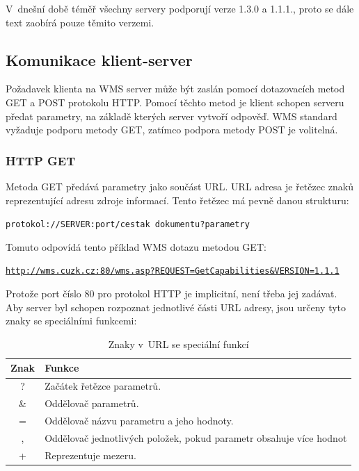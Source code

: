 \documentclass[a4paper,12pt]{article}
\begin{document}
V~dnešní době téměř všechny servery podporují verze 1.3.0 a
1.1.1., proto se dále text zaobírá pouze těmito verzemi. 

\subsection{Komunikace klient-server}

Požadavek klienta na WMS server může být zaslán pomocí dotazovacích
metod GET a POST protokolu HTTP. Pomocí těchto metod je klient schopen
serveru předat parametry, na základě kterých server vytvoří
odpověď. WMS standard vyžaduje podporu metody GET, zatímco podpora
metody POST je volitelná.

\subsubsection{HTTP GET}

Metoda GET předává parametry jako součást URL. URL adresa je řetězec
znaků reprezentující adresu zdroje informací. Tento řetězec má pevně
danou strukturu:
	
\begin{alltt}\footnotesize
	protokol:// SERVER: port / cesta k~dokumentu ? parametry
\end{alltt}
	
Tomuto odpovídá tento příklad WMS dotazu metodou GET:

\begin{alltt}\footnotesize
\url{http://wms.cuzk.cz:80/wms.asp?REQUEST=GetCapabilities&VERSION=1.1.1}
\end{alltt}

\newpage

Protože port číslo 80 pro protokol HTTP je implicitní, není třeba jej
zadávat.  Aby server byl schopen rozpoznat jednotlivé části URL
adresy, jsou určeny tyto znaky se speciálními funkcemi:

\begin{table}[h]
\centering
\begin{tabular}{|c|l|}      \hline
  Znak      &    Funkce				\\ \hline
   ?        &  Začátek řetězce parametrů.      	\\ \hline
   \&       &  Oddělovač parametrů.   		\\ \hline
   =        &  Oddělovač názvu parametru a jeho hodnoty.    \\ \hline
   ,        &  Oddělovač jednotlivých položek, pokud parametr obsahuje více hodnot\\ \hline
   +        &  Reprezentuje mezeru. 	\\ \hline
\end{tabular}
\caption{Znaky v~URL se speciální funkcí}
\label{tab:myfirsttable}
\end{table}
\end{document}
